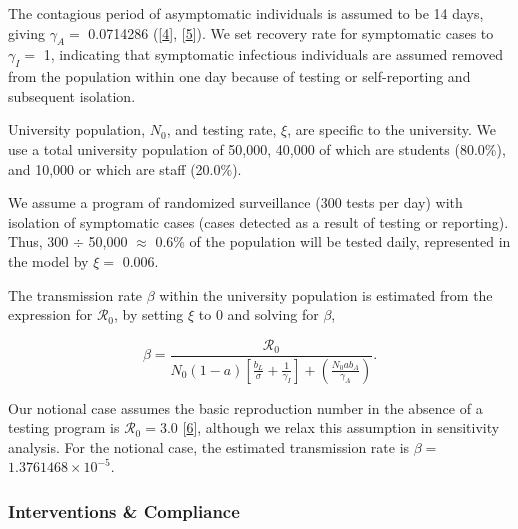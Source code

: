\documentclass[
]{article}
\begin{document}
The contagious period of asymptomatic individuals is assumed to be 14
days, giving \(\gamma_A=\) 0.0714286
({[}\protect\hyperlink{ref-Long2020-ny}{4}{]},
{[}\protect\hyperlink{ref-Oran2020-aq}{5}{]}). We set recovery rate for
symptomatic cases to \(\gamma_I=\) 1, indicating that symptomatic
infectious individuals are assumed removed from the population within
one day because of testing or self-reporting and subsequent isolation.

University population, \(N_0\), and testing rate, \(\xi\), are specific
to the university. We use a total university population of 50,000,
40,000 of which are students (80.0\%), and 10,000 or which are staff
(20.0\%).

We assume a program of randomized surveillance (300 tests per day) with
isolation of symptomatic cases (cases detected as a result of testing or
reporting). Thus, 300 \(\div\) 50,000 \(\approx\) 0.6\% of the
population will be tested daily, represented in the model by \(\xi=\)
0.006.

The transmission rate \(\beta\) within the university population is
estimated from the expression for \(\mathcal{R}_{0}\), by setting
\(\xi\) to 0 and solving for \(\beta\),

\[
\beta= \frac{\mathcal{R}_{0}}{N_{0}\left(1-a\right)\left[\frac{b_{L}}{\sigma}+\frac{1}{\gamma_{I}}\right]+\left(\frac{N_{0}ab_{A}}{\gamma_{A}}\right)}.
\]

Our notional case assumes the basic reproduction number in the absence
of a testing program is \(\mathcal{R}_{0}= 3.0\)
{[}\protect\hyperlink{ref-Park2020-vl}{6}{]}, although we relax this
assumption in sensitivity analysis. For the notional case, the estimated
transmission rate is \(\beta =\) \ensuremath{1.3761468\times 10^{-5}}.

\hypertarget{interventions-compliance}{%
\subsubsection{Interventions \&
Compliance}\label{interventions-compliance}}
\end{document}
